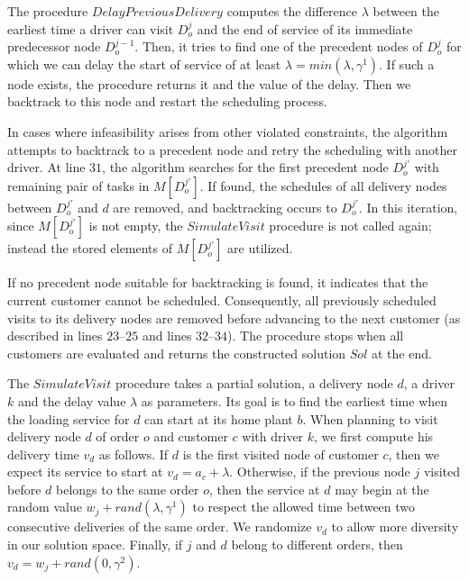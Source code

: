 \documentclass[]{article}
\begin{document}
The procedure $DelayPreviousDelivery$ computes the difference $\lambda$ between the earliest time a driver can visit $D^{j}_o$ and the end of service of its immediate predecessor node $D^{j-1}_o$. Then, it tries to find one of the precedent nodes of $D^{j}_o$ for which we can delay the start of service of at least $\lambda = min(\lambda,\gamma^1)$. If such a node exists, the procedure returns it and the value of the delay. Then we backtrack to this node and restart the scheduling process.

In cases where infeasibility arises from other violated constraints, the algorithm attempts to backtrack to a precedent node and retry the scheduling with another driver. At line $31$, the algorithm searches for the first precedent node $D^{j'}_o$ with remaining pair of tasks in $M[D^{j'}_o]$. If found, the schedules of all delivery nodes between $D^{j'}_o$ and $d$ are removed, and backtracking occurs to $D^{j'}_o$. In this iteration, since $M[D^{j'}_o]$ is not empty, the $SimulateVisit$ procedure is not called again; instead the stored elements of $M[D^{j'}_o]$ are utilized.

If no precedent node suitable for backtracking is found, it indicates that the current customer cannot be scheduled. Consequently, all previously scheduled visits to its delivery nodes are removed before advancing to the next customer (as described in lines $23$--$25$ and lines $32$--$34$). The procedure stops when all customers are evaluated and returns the constructed solution $Sol$ at the end.

The $SimulateVisit$ procedure takes a partial solution, a delivery node $d$, a driver $k$ and the delay value $\lambda$ as parameters. Its goal is to find the earliest time when the loading service for $d$ can start at its home plant $b$. When planning to visit delivery node $d$ of order $o$ and customer $c$ with driver $k$, we first compute his delivery time $v_d$ as follows. If $d$ is the first  visited node of customer $c$, then we expect its service to start at $v_d = a_c + \lambda$. Otherwise, if the previous node $j$ visited before $d$ belongs to the same order $o$, then the service at $d$ may begin at the random value $w_j + rand(\lambda, \gamma^1)$ to respect the allowed time between two consecutive deliveries of the same order. We randomize $v_d$ to allow more diversity in our solution space. Finally, if $j$ and $d$ belong to different orders, then $v_d = w_j + rand(0,\gamma^2)$.
\end{document}
